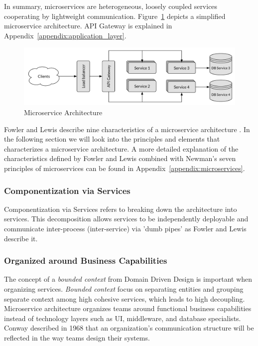 \noindent
In summary, microservices are heterogeneous, loosely coupled services cooperating by lightweight communication. Figure~\ref{fig:microservices} depicts a simplified microservice architecture. API Gateway is explained in Appendix~\ref{appendix:application_layer}.

\begin{figure}[H]
    \centering
    \includegraphics[width=14cm]{figures/microservices}
    \caption{Microservice Architecture}
    \label{fig:microservices}
\end{figure}

\noindent
Fowler and Lewis describe nine characteristics of a microservice architecture \cite{lewis2014microservices}. In the following section we will look into the principles and elements that characterizes a microservice architecture. A more detailed explanation of the characteristics defined by Fowler and Lewis combined with Newman's seven principles of microservices can be found in Appendix~\ref{appendix:microservices}.


\subsubsection*{Componentization via Services}
Componentization via Services refers to breaking down the architecture into services. This decomposition allows services to be independently deployable and communicate inter-process (inter-service) via 'dumb pipes' as Fowler and Lewis describe it. 

\subsubsection*{Organized around Business Capabilities}
The concept of a \textit{bounded context} from Domain Driven Design is important when organizing services. \textit{Bounded context} focus on separating entities and grouping separate context among high cohesive services, which leads to high decoupling. Microservice architecture organizes teams around functional business capabilities instead of technology layers such as UI, middleware, and database specialists. 
Conway described in 1968 that an organization's communication structure will be reflected in the way teams design their systems. 

